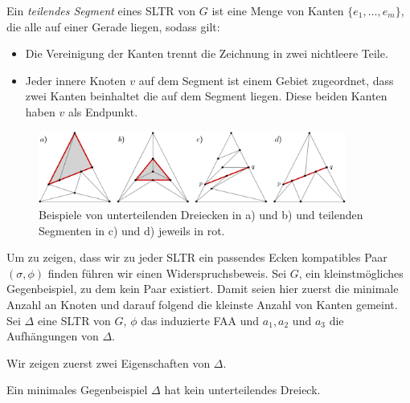 \begin{definition}
Ein \textit{teilendes Segment} eines SLTR von $G$ ist eine Menge von Kanten $\{e_1, \ldots , e_m\}$, die alle auf einer Gerade liegen, sodass gilt:
\begin{itemize}
\item Die Vereinigung der Kanten trennt die Zeichnung in zwei nichtleere Teile. 
\item Jeder innere Knoten $v$ auf dem Segment ist einem Gebiet zugeordnet, dass zwei Kanten beinhaltet die auf dem Segment liegen. Diese beiden Kanten haben $v$ als Endpunkt.
\end{itemize}
\end{definition}

\begin{figure}[h]
	\centering
	  \includegraphics[width=0.9\textwidth]{subdividing_ex.png}
    	\caption{Beispiele von unterteilenden Dreiecken in a) und b) und teilenden Segmenten in c) und d) jeweils in rot.}
    	\label{subdividing_ex}
\end{figure}

Um zu zeigen, dass wir zu jeder SLTR ein passendes Ecken kompatibles Paar $(\sigma,\phi)$ finden führen wir einen Widerspruchsbeweis. Sei $G$, ein kleinstmögliches Gegenbeispiel, zu dem kein Paar existiert. Damit seien hier zuerst die minimale Anzahl an Knoten und darauf folgend die kleinste Anzahl von Kanten gemeint. Sei $\Delta$ eine SLTR von $G$, $\phi$ das induzierte FAA und $a_1,a_2$ und $a_3$ die Aufhängungen von $\Delta$.

Wir zeigen zuerst zwei Eigenschaften von $\Delta$.

\begin{lemma}\label{lem_subtri}
Ein minimales Gegenbeispiel $\Delta$ hat kein unterteilendes Dreieck.
\end{lemma}

